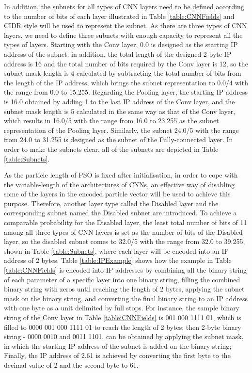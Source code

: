 \documentclass[conference]{IEEEtran}
\begin{document}
In addition, the subnets for all types of CNN layers need to be defined according to the number of bits of each layer illustrated in Table \ref{table:CNNFields} and CIDR style will be used to represent the subnet. As there are three types of CNN layers, we need to define three subnets with enough capacity to represent all the types of layers. Starting with the Conv layer, 0.0 is designed as the starting IP address of the subnet; in addition, the total length of the designed 2-byte IP address is 16 and the total number of bits required by the Conv layer is 12, so the subnet mask length is 4 calculated by subtracting the total number of bits from the length of the IP address, which brings the subnet representation to 0.0/4 with the range from 0.0 to 15.255. Regarding the Pooling layer, the starting IP address is 16.0 obtained by adding 1 to the last IP address of the Conv layer, and the subnet mask length is 5 calculated in the same way as that of the Conv layer, which results in 16.0/5 with the range from 16.0 to 23.255 as the subnet representation of the Pooling layer. Similarly, the subnet 24.0/5 with the range from 24.0 to 31.255 is designed as the subnet of the Fully-connected layer. In order to make the subnets clear, all of the subnets are depicted in Table \ref{table:Subnets}. 


As the particle length of PSO is fixed after initialisation, in order to cope with the variable-length of the architectures of CNNs, an effective way of disabling some of the layers in the encoded particle vector will be used to achieve this purpose. Therefore, another layer type called the Disabled layer and the corresponding subnet named the Disabled subnet are introduced. To achieve a comparable probability for the Disabled layer, the least total number of bits of 11 among all three types of CNN layers is set as the number of bits of the Disabled layer, so the disabled subnet comes to 32.0/5 with the range from 32.0 to 39.255, shown in Table \ref{table:Subnets}, where each layer will be encoded into an IP address of 2 bytes. Table \ref{table:IPExample} shows how the example in Table \ref{table:CNNFields} is encoded into IP addresses by combining all the binary string of each parameter of a specific layer into one binary string, filling the combined binary string with zeros until reaching the length of 2 bytes, applying the subnet mask on the binary string, and converting the final binary string to an IP address with one byte as a unit delimited by full stops. For instance, the sample binary string of the Conv layer in Table \ref{table:CNNFields} is 001 000 1111 01, which is filled to 0000 001 000 1111 01 to reach the length of 2 bytes; then 2-byte binary string - 0000 0010 and 0011 1101, can be obtained by applying the subnet mask, in which the starting IP address of the subnet is added on the binary string; Finally, the IP address of 2.61 is achieved by converting the first byte to the decimal value of 2 and the second byte to 61. 
\end{document}
